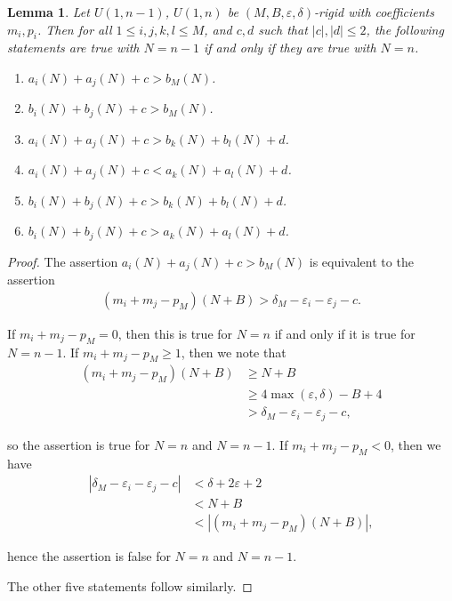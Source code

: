 \documentclass{amsart}
\theoremstyle{theorem}
\newtheorem{lemma}{Lemma}[section]
\theoremstyle{definition}
\begin{document}
\begin{lemma}\label{EndpointBounds}
Let $U(1,n - 1)$, $U(1,n)$ be $(M,B,\varepsilon,\delta)$-rigid with coefficients $m_i, p_i$. Then for all $1 \leq i,j,k,l \leq M$, and $c,d$ such that $|c|,|d| \leq 2$, the following statements are true with $N = n - 1$ if and only if they are true with $N = n$.

\begin{enumerate}
	\item $a_i(N) + a_j(N) + c > b_M(N)$.
	\item $b_i(N) + b_j(N) + c > b_M(N)$.
	\item $a_i(N) + a_j(N) + c > b_k(N) + b_l(N) + d$.
	\item $a_i(N) + a_j(N) + c < a_k(N) + a_l(N) + d$.
	\item $b_i(N) + b_j(N) + c > b_k(N) + b_l(N)+d$.
	\item $b_i(N) + b_j(N) + c > a_k(N) + a_l(N) + d$.
\end{enumerate}
\end{lemma}

\begin{proof}
The assertion $a_i(N) + a_j(N) + c > b_M(N)$ is equivalent to the assertion
	\begin{align*}
    (m_i + m_j - p_M)(N + B) > \delta_M - \varepsilon_i - \varepsilon_j - c.
    \end{align*}
    
\noindent If $m_i + m_j - p_M = 0$, then this is true for $N = n$ if and only if it is true for $N = n - 1$. If $m_i + m_j - p_M \geq 1$, then we note that
	\begin{align*}
    \left(m_i + m_j - p_M\right)(N + B) &\geq N + B \\
    &\geq 4\max(\varepsilon,\delta)-B+4 \\
    &> \delta_M - \varepsilon_i - \varepsilon_j - c, 
    \end{align*}
    
 \noindent so the assertion is true for $N = n$ and $N = n - 1$. If $m_i + m_j - p_M < 0$, then we have
 	\begin{align*}
    \left|\delta_M - \varepsilon_i - \varepsilon_j - c\right| &< \delta + 2\varepsilon + 2 \\
    &< N + B \\
    &< \left|(m_i + m_j - p_M)(N + B)\right|,
    \end{align*}
    
\noindent hence the assertion is false for $N = n$ and $N = n - 1$.
    
The other five statements follow similarly.
\end{proof}
\end{document}
